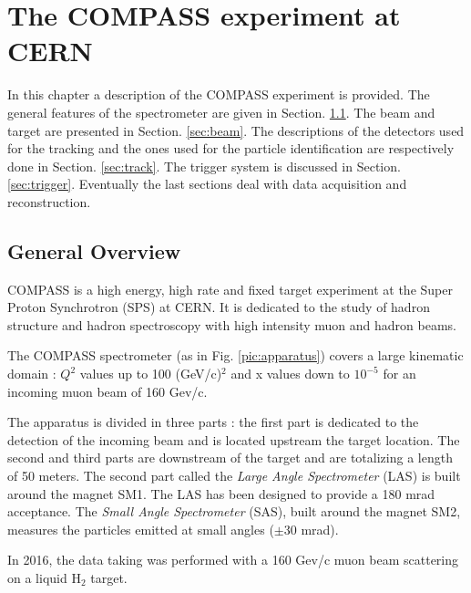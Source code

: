 
\chapter{The COMPASS experiment at CERN} %

\label{ch:exp} %

In this chapter a description of the COMPASS experiment is provided. The general features of the spectrometer are given in Section. \ref{sec:specgen}. The beam and target are presented in Section. \ref{sec:beam}. The descriptions of the detectors used for the tracking and the ones used for the particle identification are respectively done in Section. \ref{sec:track}. The trigger system is discussed in Section. \ref{sec:trigger}. Eventually the last sections deal with data acquisition and reconstruction.


\section{General Overview}\label{sec:specgen}

COMPASS is a high energy, high rate and fixed target experiment at the Super Proton Synchrotron (SPS) at CERN. It is dedicated to the study of hadron structure and hadron spectroscopy with high intensity muon and hadron beams.

The COMPASS spectrometer (as in Fig. \ref{pic:apparatus}) covers a large kinematic domain : $Q^2$ values up to 100 (GeV/c)$^2$
and x values down to $10^{-5}$ for an incoming muon beam of 160 Gev/c.

The apparatus is divided in three parts : the first part is dedicated to the detection of the incoming beam and is located upstream the target location. The second and third parts are downstream of the target and are totalizing a length of 50 meters. The second part called the \textit{Large Angle Spectrometer} (LAS) is built around the magnet SM1.
The LAS has been designed to provide a 180 mrad acceptance. The \textit{Small Angle Spectrometer} (SAS), built around the magnet SM2, measures the particles emitted at small angles ($\pm$30 mrad).

In 2016, the data taking was performed with a 160 Gev/c muon beam scattering on a liquid H$_2$ target.

